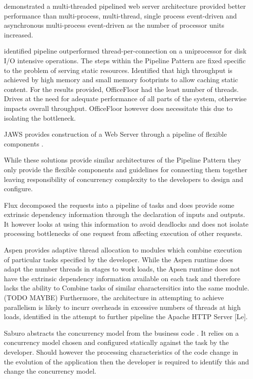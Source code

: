 \documentclass[conference]{ieee/IEEEtran}
\begin{document}
\cite{multithread-pipeline} demonstrated a multi-threaded pipelined web server
architecture provided better performance than multi-process, multi-thread,
single process event-driven and asynchronous multi-process event-driven as the
number of processor units increased.

\cite{knot-userver-watpipe} identified pipeline outperformed
thread-per-connection on a uniprocessor for disk I/O intensive operations. The
steps within the Pipeline Pattern are fixed specific to the problem of serving
static resources.  Identified that high throughput is achieved by high memory
and small memory footprints to allow caching static content.  For the results
provided, OfficeFloor had the least number of threads.  Drives at the need for
adequate performance of all parts of the system, otherwise impacts overall
throughput.  OfficeFloor however does necessitate this due to isolating the
bottleneck.

JAWS provides construction of a Web Server through a pipeline of flexible
components \cite{jaws}.

While these solutions provide similar architectures of the Pipeline Pattern
they only provide the flexible components and guidelines for connecting them
together leaving responsibility of concurrency complexity to the developers to
design and configure.

Flux \cite{flux} decomposed the requests into a pipeline of tasks and does
provide some extrinsic dependency information through the declaration of inputs and
outputs.  It however looks at using this information to avoid deadlocks and
does not isolate processing bottlenecks of one request from affecting execution
of other requests.
   
Aspen \cite{aspen} provides adaptive thread allocation to modules which combine
execution of particular tasks specified by the developer.  While the Aspen
runtime does adapt the number threads in stages to work loads, the Apsen runtime
does not have the extrinsic dependency information available on each task and
therefore lacks the ability to Combine tasks of similar charactersitics into the
same module.  (TODO MAYBE) Furthermore, the architecture in attempting to
achieve parallelism is likely to incurr overheads in excessive numbers of
threads at high loads, identified in the attempt to further pipeline the Apache
HTTP Server [Le].
   
Saburo abstracts the concurrency model from the business code \cite{saburo}.
It relies on a concurrency model chosen and configured statically against the
task by the developer.  Should however the processing characteristics of the
code change in the evolution of the application then the developer is required
to identify this and change the concurrency model.
\end{document}
